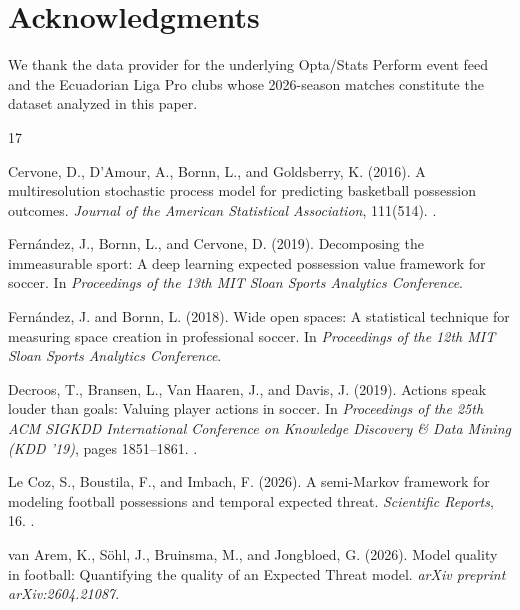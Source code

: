 \documentclass[11pt]{article}
\theoremstyle{plain}
\theoremstyle{definition}
\theoremstyle{remark}
\begin{document}
\section*{Acknowledgments}
We thank the data provider for the underlying Opta/Stats Perform event feed and the Ecuadorian Liga Pro clubs whose 2026-season matches constitute the dataset analyzed in this paper.


\begin{thebibliography}{17}

Cervone, D., D'Amour, A., Bornn, L., and Goldsberry, K. (2016).
\newblock A multiresolution stochastic process model for predicting basketball possession outcomes.
\newblock \emph{Journal of the American Statistical Association}, 111(514).
\newblock {}.

Fern\'{a}ndez, J., Bornn, L., and Cervone, D. (2019).
\newblock Decomposing the immeasurable sport: A deep learning expected possession value framework for soccer.
\newblock In \emph{Proceedings of the 13th MIT Sloan Sports Analytics Conference}.

Fern\'{a}ndez, J. and Bornn, L. (2018).
\newblock Wide open spaces: A statistical technique for measuring space creation in professional soccer.
\newblock In \emph{Proceedings of the 12th MIT Sloan Sports Analytics Conference}.

Decroos, T., Bransen, L., Van Haaren, J., and Davis, J. (2019).
\newblock Actions speak louder than goals: Valuing player actions in soccer.
\newblock In \emph{Proceedings of the 25th ACM SIGKDD International Conference on Knowledge Discovery \& Data Mining (KDD '19)}, pages 1851--1861.
\newblock {}.

Le Coz, S., Boustila, F., and Imbach, F. (2026).
\newblock A semi-Markov framework for modeling football possessions and temporal expected threat.
\newblock \emph{Scientific Reports}, 16.
\newblock {}.

van Arem, K., S\"{o}hl, J., Bruinsma, M., and Jongbloed, G. (2026).
\newblock Model quality in football: Quantifying the quality of an Expected Threat model.
\newblock \emph{arXiv preprint arXiv:2604.21087}.


\end{thebibliography}
\end{document}
